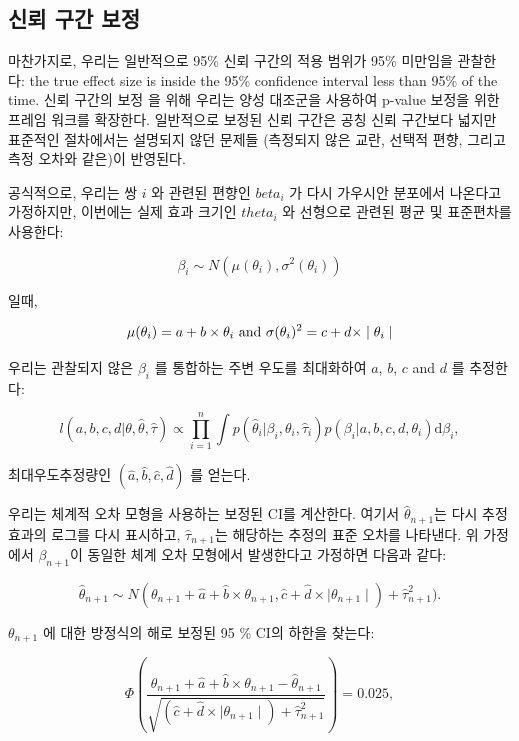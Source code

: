 \documentclass[11pt]{book}
\theoremstyle{definition}
\theoremstyle{definition}
\theoremstyle{definition}
\theoremstyle{remark}
\begin{document}
\subsection{신뢰 구간 보정}\label{--}


마찬가지로, 우리는 일반적으로 95\% 신뢰 구간의 적용 범위가 95\% 미만임을
관찰한다: the true effect size is inside the 95\% confidence interval
less than 95\% of the time. 신뢰 구간의 보정 \citep{schuemie_2018} 을
위해 우리는 양성 대조군을 사용하여 p-value 보정을 위한 프레임 워크를
확장한다. 일반적으로 보정된 신뢰 구간은 공칭 신뢰 구간보다 넓지만
표준적인 절차에서는 설명되지 않던 문제들 (측정되지 않은 교란, 선택적
편향, 그리고 측정 오차와 같은)이 반영된다.

공식적으로, 우리는 쌍 \(i\) 와 관련된 편향인 \(beta_i\) 가 다시 가우시안
분포에서 나온다고 가정하지만, 이번에는 실제 효과 크기인 \(theta_i\) 와
선형으로 관련된 평균 및 표준편차를 사용한다:

\[\beta_i \sim N(\mu(\theta_i) , \sigma^2(\theta_i))\]

일때,

\[\mu(\theta_i) = a + b \times \theta_i \text{ and } \\
  \sigma(\theta_i) ^2= c + d \times \mid \theta_i \mid\]

우리는 관찰되지 않은 \(\beta_i\) 를 통합하는 주변 우도를 최대화하여
\(a\), \(b\), \(c\) and \(d\) 를 추정한다:

\[l(a,b,c,d | \theta, \hat{\theta}, \hat{\tau} ) \propto \prod_{i=1}^{n}\int p(\hat{\theta}_i|\beta_i, \theta_i, \hat{\tau}_i)p(\beta_i|a,b,c,d,\theta_i) \text{d}\beta_i ,\]

최대우도추정량인 \((\hat{a}, \hat{b}, \hat{c}, \hat{d})\) 를 얻는다.

우리는 체계적 오차 모형을 사용하는 보정된 CI를 계산한다. 여기서
\(\hat{\theta}_{n+1}\)는 다시 추정 효과의 로그를 다시 표시하고,
\(\hat{\tau}_{n+1}\)는 해당하는 추정의 표준 오차를 나타낸다. 위 가정에서
\(\beta_{n+1}\)이 동일한 체계 오차 모형에서 발생한다고 가정하면 다음과
같다:

\[\hat{\theta}_{n+1} \sim N(
\theta_{n+1} + \hat{a} + \hat{b} \times \theta_{n+1},
\hat{c} + \hat{d} \times \mid \theta_{n+1} \mid) + \hat{\tau}_{n+1}^2) .\]

\(\theta_{n+1}\) 에 대한 방정식의 해로 보정된 95 \% CI의 하한을 찾는다:

\[\Phi\left(
\frac{\theta_{n+1} + \hat{a} + \hat{b} \times \theta_{n+1}-\hat{\theta}_{n+1}}
{\sqrt{(\hat{c} + \hat{d} \times \mid \theta_{n+1} \mid) + \hat{\tau}_{n+1}^2}}
\right) = 0.025 ,\]
\end{document}
